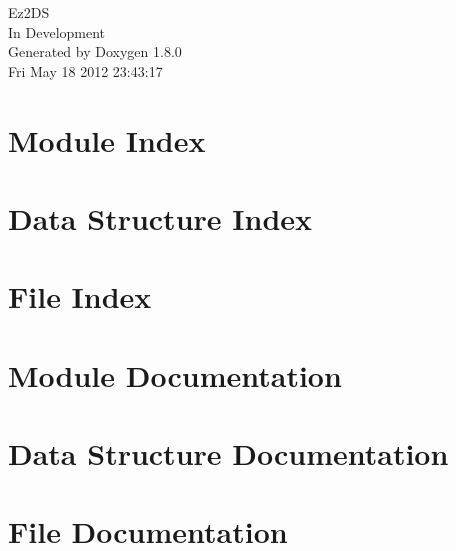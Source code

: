 \documentclass{book}
\begin{document}
\hypersetup{pageanchor=false,citecolor=blue}
\begin{titlepage}
\vspace*{7cm}
\begin{center}
{\Large Ez2\-D\-S \\[1ex]\large In Development }\\
\vspace*{1cm}
{\large Generated by Doxygen 1.8.0}\\
\vspace*{0.5cm}
{\small Fri May 18 2012 23:43:17}\\
\end{center}
\end{titlepage}
\clearemptydoublepage
{}
\tableofcontents
\clearemptydoublepage
{}
\hypersetup{pageanchor=true,citecolor=blue}
\chapter{Module Index}

\chapter{Data Structure Index}

\chapter{File Index}

\chapter{Module Documentation}







\chapter{Data Structure Documentation}













\chapter{File Documentation}








\printindex
\end{document}
